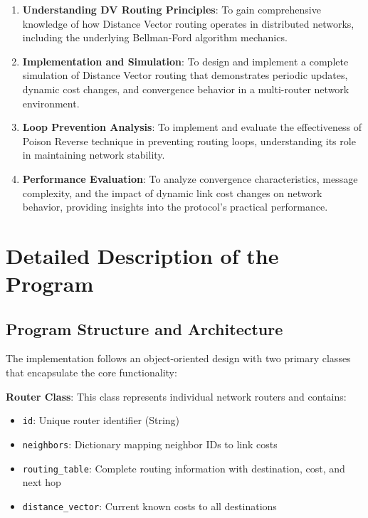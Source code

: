 \documentclass[12pt,a4paper]{article}
\begin{document}
\begin{enumerate}
\item \textbf{Understanding DV Routing Principles}: To gain comprehensive knowledge of how Distance Vector routing operates in distributed networks, including the underlying Bellman-Ford algorithm mechanics.

\item \textbf{Implementation and Simulation}: To design and implement a complete simulation of Distance Vector routing that demonstrates periodic updates, dynamic cost changes, and convergence behavior in a multi-router network environment.

\item \textbf{Loop Prevention Analysis}: To implement and evaluate the effectiveness of Poison Reverse technique in preventing routing loops, understanding its role in maintaining network stability.

\item \textbf{Performance Evaluation}: To analyze convergence characteristics, message complexity, and the impact of dynamic link cost changes on network behavior, providing insights into the protocol's practical performance.
\end{enumerate}

\section{Detailed Description of the Program}

\subsection{Program Structure and Architecture}

The implementation follows an object-oriented design with two primary classes that encapsulate the core functionality:

\textbf{Router Class}: This class represents individual network routers and contains:
\begin{itemize}
\item \texttt{id}: Unique router identifier (String)
\item \texttt{neighbors}: Dictionary mapping neighbor IDs to link costs
\item \texttt{routing\_table}: Complete routing information with destination, cost, and next hop
\item \texttt{distance\_vector}: Current known costs to all destinations
\end{itemize}
\end{document}

